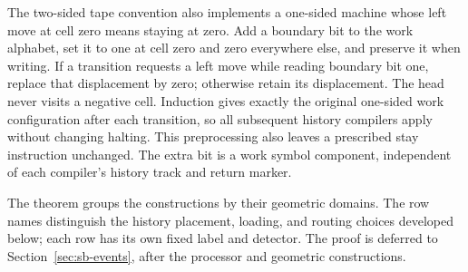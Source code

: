 \begin{remark}\label{rem:sb-one-sided}
The two-sided tape convention also implements a one-sided machine whose
left move at cell zero means staying at zero. Add a boundary bit to the
work alphabet, set it to one at cell zero and zero everywhere else,
and preserve it when writing. If a transition requests a left move
while reading boundary bit one, replace that displacement by zero;
otherwise retain its displacement. The head never visits a negative
cell. Induction gives exactly the original one-sided work configuration
after each transition, so all subsequent history compilers apply without
changing halting. This preprocessing also leaves a prescribed stay
instruction unchanged. The extra bit is a work symbol component,
independent of each compiler's history track and return marker.
\end{remark}

The theorem groups the constructions by their geometric domains. The
row names distinguish the history placement, loading, and routing
choices developed below; each row has its own fixed label and detector.
The proof is deferred to Section~\ref{sec:sb-events}, after the processor
and geometric constructions.

